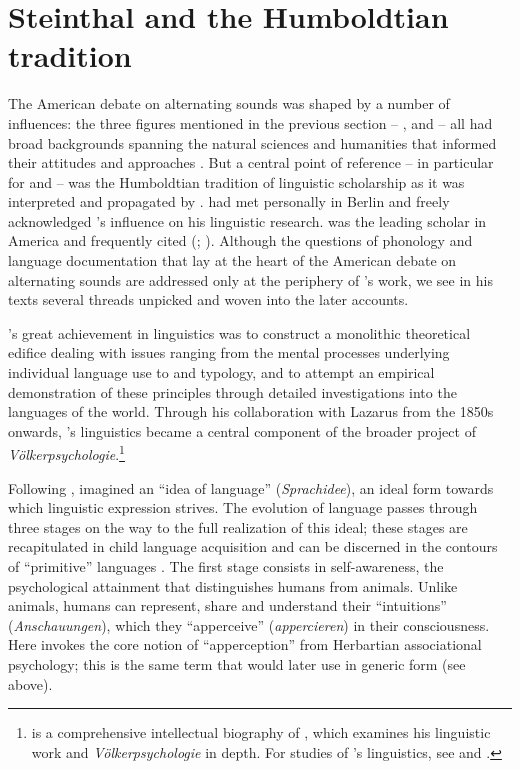 \documentclass[output=paper]{langscibook}
\begin{document}
\section{Steinthal and the Humboldtian tradition}
\label{sec:mcelvenny:humboldtian}

The American debate on alternating sounds was shaped by a number of influences: the three figures mentioned in the previous section -- {\Brinton}, {\Powell} and {\Boas} -- all had broad backgrounds spanning the natural sciences and humanities that informed their attitudes and approaches \citep[see][]{Darnell1998}. But a central point of reference -- in particular for {\Brinton} and {\Boas} -- was the Humboldtian tradition of linguistic scholarship as it was interpreted and propagated by {\Steinthal}. {\Boas} had met {\Steinthal} personally in Berlin and freely acknowledged {\Steinthal}'s influence on his linguistic research. {\Brinton} was the leading {\Humboldt} scholar in America and frequently cited {\Steinthal} (\citealt[see][63--69]{Bunzl1996}; \citealt[289--292]{TrautmannWaller2006}). Although the questions of phonology and language documentation that lay at the heart of the American debate on alternating sounds are addressed only at the periphery of {\Steinthal}'s work, we see in his texts several threads unpicked and woven into the later accounts.

{\Steinthal}'s great achievement in linguistics was to construct a monolithic theoretical edifice dealing with issues ranging from the mental processes underlying individual language use to  and typology, and to attempt an empirical demonstration of these principles through detailed investigations into the languages of the world. Through his collaboration with Lazarus from the 1850s onwards, {\Steinthal}'s linguistics became a central component of the broader project of \emph{Völkerpsychologie}.\footnote{\citet{TrautmannWaller2006} is a comprehensive intellectual biography of {\Steinthal}, which examines his linguistic work and \emph{Völkerpsychologie} in depth. For studies of {\Steinthal}'s linguistics, see \citet{Bumann1965} and \citet{Ringmacher1996}.} 

Following {\Humboldt}, {\Steinthal} imagined an ``idea of language'' (\emph{Sprachidee}), an ideal form towards which linguistic expression strives. The evolution of language passes through three stages on the way to the full realization of this ideal; these stages are recapitulated in child language acquisition and can be discerned in the contours of ``primitive'' languages \citep[cf.][81--93]{Bumann1965}. The first stage consists in self-awareness, the psychological attainment that distinguishes humans from animals. Unlike animals, humans can represent, share and understand their ``intuitions'' (\emph{Anschauungen}), which they ``apperceive'' (\emph{appercieren}) in their consciousness. Here {\Steinthal} invokes the core notion of ``apperception'' from Herbartian associational psychology; this is the same term that {\Boas} would later use in generic form (see  above). 
\end{document}
